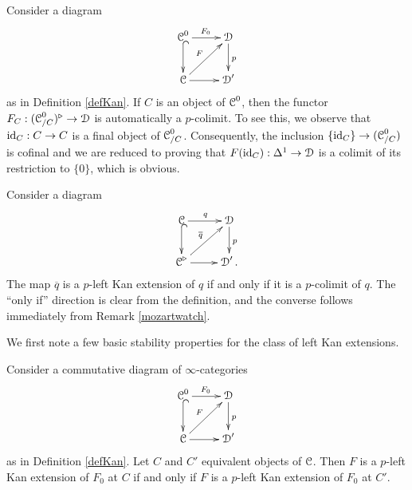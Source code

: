 \begin{remark}\label{mozartwatch}
Consider a diagram
$$ \xymatrix{ \calC^{0} \ar@{^{(}->}[d] \ar[r]^{F_0} & \calD \ar[d]^{p} \\
\calC \ar[r] \ar[ur]^{F} & \calD' }$$
as in Definition \ref{defKan}. If
$C$ is an object of $\operatorname{\mathcal{C}}^{0}$, then the functor $F_{C}: (\operatorname{\mathcal{C}}_{/C}^{0})^{\triangleright} \rightarrow \operatorname{\mathcal{D}}$ is automatically a $p$-colimit. To see this, we observe that $\operatorname{id}_{C}: C \rightarrow C$ is a final object of $\operatorname{\mathcal{C}}^{0}_{/C}$. Consequently, the inclusion $\{ \operatorname{id}_C \} \rightarrow (\operatorname{\mathcal{C}}_{/C}^{0})$
is cofinal and we are reduced to proving that $F(\operatorname{id}_{C}): \Delta^1 \rightarrow \operatorname{\mathcal{D}}$ is a colimit
of its restriction to $\{0\}$, which is obvious.
\end{remark}

\begin{example}
Consider a diagram
$$ \xymatrix{ \calC \ar@{^{(}->}[d] \ar[r]^{q} & \calD \ar[d]^{p} \\
\calC^{\triangleright} \ar[r] \ar[ur]^{\overline{q}} & \calD'. }$$
The map $\overline{q}$ is a $p$-left Kan extension of $q$ if and only if it is a $p$-colimit of $q$.
The ``only if'' direction is clear from the definition, and the converse follows immediately from 
Remark \ref{mozartwatch}.
\end{example}

We first note a few basic stability properties for the class of left Kan extensions.

\begin{lemma}\label{switcher}
Consider a commutative diagram of $\infty$-categories
$$ \xymatrix{ \calC^{0} \ar@{^{(}->}[d] \ar[r]^{F_0} & \calD \ar[d]^{p} \\
\calC \ar[r] \ar[ur]^{F} & \calD' }$$
as in Definition \ref{defKan}. Let $C$ and $C'$ equivalent objects of $\operatorname{\mathcal{C}}$.
Then $F$ is a $p$-left Kan extension of $F_0$ at $C$ if and only if 
$F$ is a $p$-left Kan extension of $F_0$ at $C'$.
\end{lemma}

